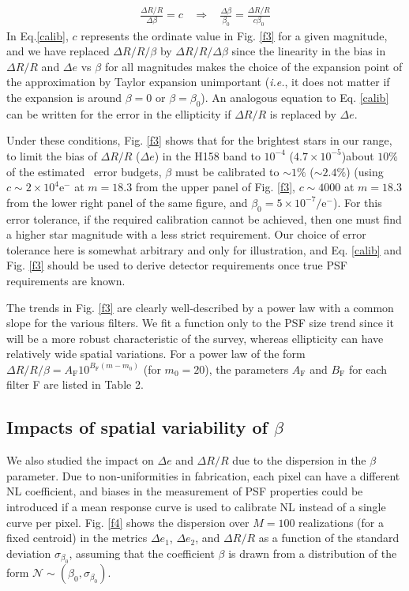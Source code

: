 \documentclass[11pt,preprint,flushrt]{aastex}
\begin{document}
\begin{align}
\frac{\Delta R/R}{\Delta \beta} = c \ \ \ \  \Rightarrow \ \ \ \ %
\frac{\Delta \beta}{\beta_0} = \frac{\Delta R/R}{c \beta_0}
\label{calib}
\end{align}
In Eq.\ref{calib}, $c$ represents the ordinate value in Fig. \ref{f3} for a given magnitude, and we have replaced $\Delta R/R/\beta$ by $\Delta R/R/ \Delta \beta$ since the linearity in the bias in $\Delta R/R$ and $\Delta e$ vs $\beta$ for all magnitudes makes the choice of the expansion point of the approximation by Taylor expansion unimportant (\emph{i.e.}, it does not matter if the expansion is around $\beta=0$ or $\beta=\beta_0$). An analogous equation to Eq. \ref{calib} can be written for the error in the ellipticity if $\Delta R/R$ is replaced by $\Delta e$. 

Under these conditions, Fig. \ref{f3} shows that for the brightest stars in our range, to limit the bias of $\Delta R/R$ ($\Delta e$) in the H158 band to $10^{-4}$  ($4.7\times 10^{-5}$)\textemdash about $10\%$ of the estimated \wf\ error budgets, $\beta$ must be calibrated to $\sim1\%$ ($\sim 2.4\%$) (using $c\sim2\times10^4 \mathrm{e^-}$ at $m=18.3$ from the upper panel of Fig. \ref{f3}, $c\sim4000$ at $m=18.3$ from the lower right panel of the same figure, and $\beta_0=5\times10^{-7}/\mathrm{e^-}$). For this error tolerance, if the required calibration cannot be achieved, then one must find a higher star magnitude with a less strict requirement.  Our choice of error tolerance here is somewhat arbitrary and only for illustration, and Eq. \ref{calib} and Fig. \ref{f3} should be used to derive detector requirements once true PSF requirements are known.

The trends in Fig. \ref{f3} are clearly well-described by a power law with a common slope for the various filters.  We fit a function only to the PSF size trend since it will be a more robust characteristic of the  survey, whereas ellipticity can have relatively wide spatial variations.  For a power law of the form $\Delta R/ R/ \beta = A_{\text{F}} 10^{B_{\text{F}} (m - m_{0})}$ (for $m_0 =20$), the parameters $A_{\text{F}}$ and $B_{\text{F}}$ for each filter F are listed in Table 2. 

\subsection{Impacts of spatial variability of $\beta$}
We also studied the impact on $\Delta e$ and $\Delta R/R$ due to the dispersion in the $\beta$ parameter. Due to non-uniformities in fabrication, each pixel can have a different NL coefficient, and biases in the measurement of PSF properties could be introduced if a mean response curve is used to calibrate NL instead of a single curve per pixel. Fig. \ref{f4} shows the dispersion over $M=100$ realizations (for a fixed centroid) in the metrics $\Delta e_1$,  $\Delta e_2$, and  $\Delta R/R$  as a function of the standard deviation $ \sigma_{\beta_0}$, assuming that the coefficient $\beta$ is drawn from a distribution of the form $\mathcal{N} \sim (\beta_0, \sigma_{\beta_0})$. 
\end{document}
